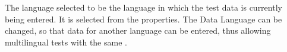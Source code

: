 \item[Data Language]{The language selected to be the language in which the test data is currently being entered. It is selected from the \gdproject properties.
 The Data Language can be changed, so that data for another language can be entered, thus allowing multilingual tests with the same \gdcase{}. 
}
